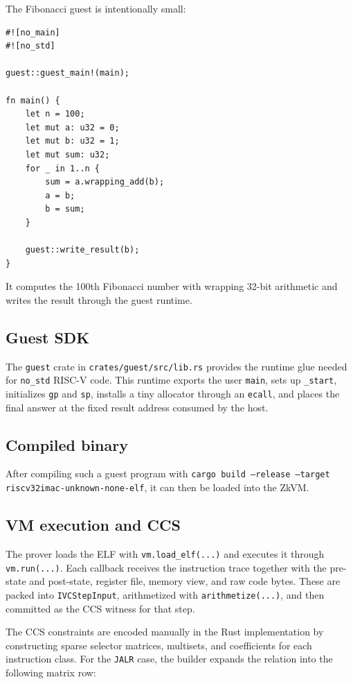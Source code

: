 The Fibonacci guest is intentionally small:

\begin{verbatim}
#![no_main]
#![no_std]

guest::guest_main!(main);

fn main() {
    let n = 100;
    let mut a: u32 = 0;
    let mut b: u32 = 1;
    let mut sum: u32;
    for _ in 1..n {
        sum = a.wrapping_add(b);
        a = b;
        b = sum;
    }

    guest::write_result(b);
}
\end{verbatim}

It computes the 100th Fibonacci number with wrapping 32-bit arithmetic and writes the result through the guest runtime.

\subsection{Guest SDK}

The \texttt{guest} crate in \texttt{crates/guest/src/lib.rs} provides the runtime glue needed for \texttt{no\_std} RISC-V code.
This runtime exports the user \texttt{main}, sets up \texttt{\_start},
initializes \texttt{gp} and \texttt{sp}, installs a tiny allocator through an
\texttt{ecall}, and places the final answer at the fixed result address
consumed by the host.

\subsection{Compiled binary}

After compiling such a guest program with \texttt{cargo build --release --target riscv32imac-unknown-none-elf},
it can then be loaded into the ZkVM.

\subsection{VM execution and CCS}

The prover loads the ELF with \texttt{vm.load\_elf(...)} and executes it through \texttt{vm.run(...)}. Each callback receives the instruction trace together with the pre-state and post-state, register file, memory view, and raw code bytes. These are packed into \texttt{IVCStepInput}, arithmetized with \texttt{arithmetize(...)}, and then committed as the CCS witness for that step.

The CCS constraints are encoded manually in the Rust implementation by constructing sparse selector matrices, multisets, and coefficients for each instruction class. For the \texttt{JALR} case, the builder expands the relation into the following matrix row:

